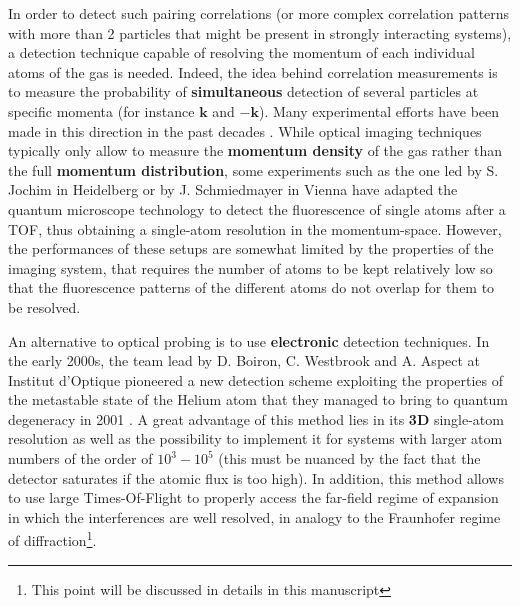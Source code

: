 In order to detect such pairing correlations (or more complex correlation patterns with more than 2 particles that might be present in strongly interacting systems), a detection technique capable of resolving the momentum of each individual atoms of the gas is needed. Indeed, the idea behind correlation measurements is to measure the probability of \textbf{simultaneous} detection of several particles at specific momenta (for instance $\bm{k}$ and $-\bm{k}$). Many experimental efforts have been made in this direction in the past decades \cite{ott2016single}. While optical imaging techniques typically only allow to measure the \textbf{momentum density} of the gas rather than the full \textbf{momentum distribution}, some experiments such as the one led by S. Jochim in Heidelberg \cite{serwane2011deterministic} or by J. Schmiedmayer in Vienna \cite{bucker2009single} have adapted the quantum microscope technology to detect the fluorescence of single atoms after a TOF, thus obtaining a single-atom resolution in the momentum-space. However, the performances of these setups are somewhat limited by the properties of the imaging system, that requires the number of atoms to be kept relatively low so that the fluorescence patterns of the different atoms do not overlap for them to be resolved.

An alternative to optical probing is to use \textbf{electronic} detection techniques. In the early 2000s, the team lead by D. Boiron, C. Westbrook and A. Aspect at Institut d'Optique pioneered a new detection scheme exploiting the properties of the metastable state of the Helium atom that they managed to bring to quantum degeneracy in 2001 \cite{robert2001bose}. A great advantage of this method lies in its \textbf{3D} single-atom resolution as well as the possibility to implement it for systems with larger atom numbers of the order of $10^3-10^5$ (this must be nuanced by the fact that the detector saturates if the atomic flux is too high). In addition, this method allows to use large Times-Of-Flight to properly access the far-field regime of expansion in which the interferences are well resolved, in analogy to the Fraunhofer regime of diffraction\footnote{This point will be discussed in details in this manuscript}.

